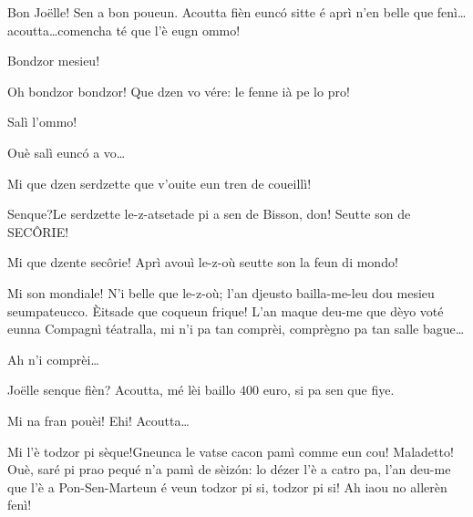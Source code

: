 \begin{drama}

\Dallasspeaks Bon Jo\"{e}lle! Sen a bon poueun. Acoutta fièn eunc\'o sitte é aprì n'en belle que fenì\ldots acoutta\ldots comencha té que l'è eugn ommo!


\Joellespeaks Bondzor mesieu!

\Pompiolenspeaks Oh bondzor bondzor! Que dzen vo vére: le fenne ià pe lo pro!

\Dallasspeaks Salì l'ommo!

\Pompiolenspeaks Ouè salì eunc\'o a vo\ldots

\Dallasspeaks Mi que dzen serdzette que v'ouite eun tren de coueillì!


\Pompiolenspeaks{} Senque?Le serdzette le-z-atsetade pi a sen de Bisson, don! Seutte son de SEC\^ORIE!


\Joellespeaks  Mi que dzente sec\^orie! Aprì avouì le-z-où seutte son la feun di mondo! 

\Pompiolenspeaks Mi son mondiale! N’i belle que le-z-où; l'an djeusto bailla-me-leu dou mesieu seumpateucco. \`Eitsade que coqueun frique!   L'an maque deu-me que dèyo voté eunna Compagnì téatralla, mi n'i pa tan comprèi, comprègno pa tan salle bague\ldots

\Joellespeaks{} Ah n'i comprèi\ldots


\Dallasspeaks Jo\"{e}lle senque fièn? Acoutta, mé lèi baillo $400$ euro, si pa sen que fiye.

\Joellespeaks Mi na fran pouèi! Ehi!  Acoutta\ldots

\Pompiolenspeaks Mi l'è todzor pi sèque!Gneunca le vatse cacon pamì comme eun cou! Maladetto! Ouè, saré pi prao pequé n'a pamì de sèiz\'on: lo dézer l'è a catro pa, l'an deu-me que l'è a Pon-Sen-Marteun é veun todzor pi si, todzor pi si! Ah iaou no allerèn fenì!


\end{drama}
